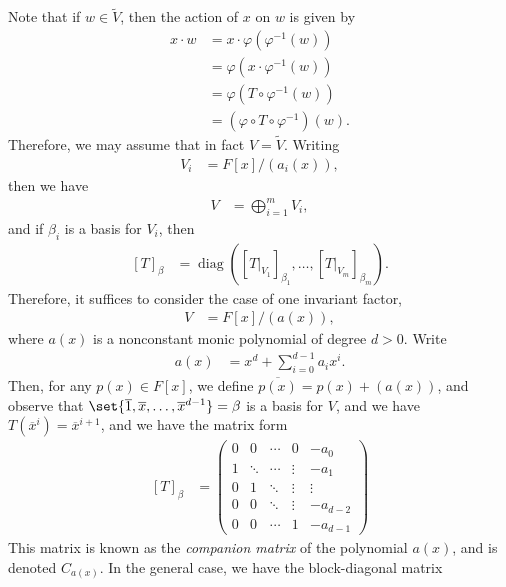 \documentclass[10pt]{mypackage}
\begin{document}
Note that if $w\in \widetilde{V}$, then the action of $x$ on $w$ is given by
\begin{align*}
  x\cdot w &= x\cdot \varphi\left( \varphi^{-1}(w) \right)\\
           &= \varphi\left( x\cdot \varphi^{-1}(w) \right)\\
           &= \varphi\left( T\circ \varphi^{-1}(w) \right)\\
           &= \left( \varphi\circ T \circ \varphi^{-1} \right)(w).
\end{align*}
Therefore, we may assume that in fact $V = \widetilde{V}$. Writing
\begin{align*}
  V_i &= F[x]/\left( a_i(x) \right),
\end{align*}
then we have
\begin{align*}
  V &= \bigoplus_{i=1}^{m} V_i,
\end{align*}
and if $\beta_i$ is a basis for $V_i$, then
\begin{align*}
  \left[ T \right]_{\beta} &= \operatorname{diag}\left( \left[ T|_{V_1} \right]_{\beta_1},\dots,\left[ T|_{V_m} \right]_{\beta_m} \right).
\end{align*}
Therefore, it suffices to consider the case of one invariant factor,
\begin{align*}
  V &= F[x]/\left( a(x) \right),
\end{align*}
where $a(x)$ is a nonconstant monic polynomial of degree $d > 0$. Write
\begin{align*}
  a(x) &= x^d + \sum_{i=0}^{d-1}a_ix^i.
\end{align*}
Then, for any $p(x)\in F[x]$, we define $ \overline{p(x)} = p(x) + \left( a(x) \right) $, and observe that $\set{ \overline{1}, \overline{x},\dots, \overline{x}^{d-1} } = \beta$ is a basis for $V$, and we have $ T \left( \overline{x}^i \right) = \overline{x}^{i+1} $, and we have the matrix form
\begin{align*}
  \left[ T \right]_{\beta} &= \begin{pmatrix}
0 & 0 & \cdots & 0 & -a_0 \\
1 & \ddots & \cdots & \vdots & -a_1 \\
0 & 1 & \ddots & \vdots & \vdots \\
0 & 0 & \ddots & \vdots & -a_{d-2} \\
0 & 0 & \cdots & 1 & -a_{d-1} 
\end{pmatrix}
\end{align*}
This matrix is known as the \textit{companion matrix} of the polynomial $a(x)$, and is denoted $C_{a(x)}$. In the general case, we have the block-diagonal matrix
\end{document}
